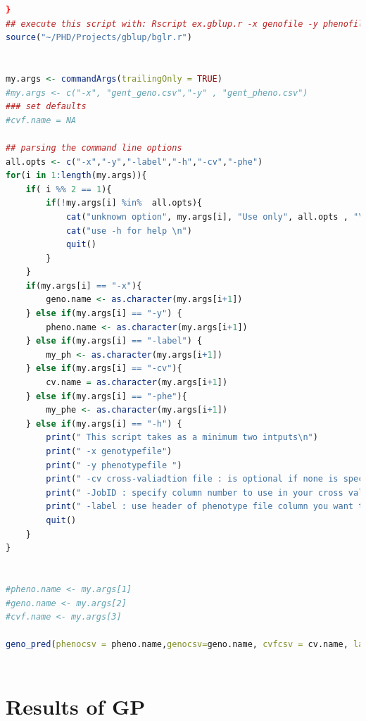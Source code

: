 \begin{lstlisting}[language=R]
  }
## execute this script with: Rscript ex.gblup.r -x genofile -y phenofile -c cv file
source("~/PHD/Projects/gblup/bglr.r")


my.args <- commandArgs(trailingOnly = TRUE)
#my.args <- c("-x", "gent_geno.csv","-y" , "gent_pheno.csv")
### set defaults 
#cvf.name = NA

## parsing the command line options 
all.opts <- c("-x","-y","-label","-h","-cv","-phe")
for(i in 1:length(my.args)){
    if( i %% 2 == 1){
        if(!my.args[i] %in%  all.opts){
            cat("unknown option", my.args[i], "Use only", all.opts , "\n")
            cat("use -h for help \n")
            quit()
        }
    }    
    if(my.args[i] == "-x"){
        geno.name <- as.character(my.args[i+1])
    } else if(my.args[i] == "-y") {
        pheno.name <- as.character(my.args[i+1])
    } else if(my.args[i] == "-label") {
        my_ph <- as.character(my.args[i+1])
    } else if(my.args[i] == "-cv"){
        cv.name = as.character(my.args[i+1])
    } else if(my.args[i] == "-phe"){
        my_phe <- as.character(my.args[i+1])
    } else if(my.args[i] == "-h") {
        print(" This script takes as a minimum two intputs\n")
        print(" -x genotypefile")
        print(" -y phenotypefile ")
        print(" -cv cross-valiadtion file : is optional if none is specified random 5 fold cv will be used")
        print(" -JobID : specify column number to use in your cross validation file")
        print(" -label : use header of phenotype file column you want to use")
        quit()
    }
}


#pheno.name <- my.args[1]
#geno.name <- my.args[2]
#cvf.name <- my.args[3]

geno_pred(phenocsv = pheno.name,genocsv=geno.name, cvfcsv = cv.name, label=my_ph,mod = "BRR", phe =my_phe)



\end{lstlisting}



\section{Results of GP} \label{AC:gp_res}
  
